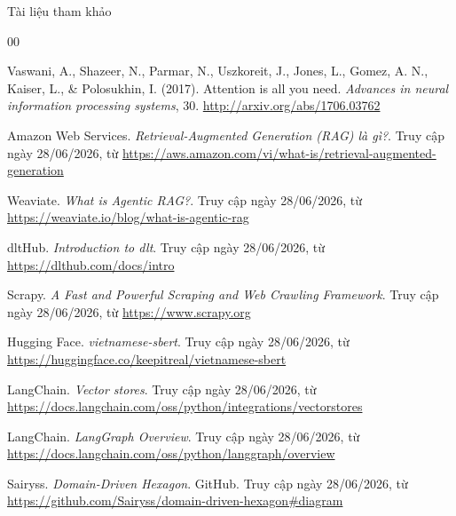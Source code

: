 \begin{frame}{Tài liệu tham khảo}
\begin{thebibliography}{00}

Vaswani, A., Shazeer, N., Parmar, N., Uszkoreit, J., Jones, L., Gomez, A. N., Kaiser, L., \& Polosukhin, I. (2017). Attention is all you need. \textit{Advances in neural information processing systems}, 30. \url{http://arxiv.org/abs/1706.03762}



Amazon Web Services. \textit{Retrieval-Augmented Generation (RAG) là gì?}. Truy cập ngày 28/06/2026, từ \url{https://aws.amazon.com/vi/what-is/retrieval-augmented-generation}

Weaviate. \textit{What is Agentic RAG?}. Truy cập ngày 28/06/2026, từ \url{https://weaviate.io/blog/what-is-agentic-rag}

dltHub. \textit{Introduction to dlt}. Truy cập ngày 28/06/2026, từ \url{https://dlthub.com/docs/intro}

Scrapy. \textit{A Fast and Powerful Scraping and Web Crawling Framework}. Truy cập ngày 28/06/2026, từ \url{https://www.scrapy.org}

Hugging Face. \textit{vietnamese-sbert}. Truy cập ngày 28/06/2026, từ \url{https://huggingface.co/keepitreal/vietnamese-sbert}

LangChain. \textit{Vector stores}. Truy cập ngày 28/06/2026, từ \url{https://docs.langchain.com/oss/python/integrations/vectorstores}

LangChain. \textit{LangGraph Overview}. Truy cập ngày 28/06/2026, từ \url{https://docs.langchain.com/oss/python/langgraph/overview}

Sairyss. \textit{Domain-Driven Hexagon}. GitHub. Truy cập ngày 28/06/2026, từ \url{https://github.com/Sairyss/domain-driven-hexagon#diagram}



\end{thebibliography}
\end{frame}
